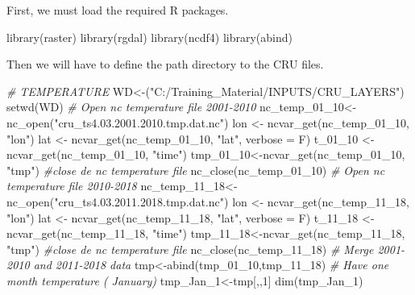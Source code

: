 \documentclass[
  10pt,
  b5paper,
]{book}
\newenvironment{Shaded}{\begin{snugshade}}{\end{snugshade}}
\newcommand{\AttributeTok}[1]{\textcolor[rgb]{0.77,0.63,0.00}{#1}}
\newcommand{\CommentTok}[1]{\textcolor[rgb]{0.56,0.35,0.01}{\textit{#1}}}
\newcommand{\DecValTok}[1]{\textcolor[rgb]{0.00,0.00,0.81}{#1}}
\newcommand{\FunctionTok}[1]{\textcolor[rgb]{0.00,0.00,0.00}{#1}}
\newcommand{\NormalTok}[1]{#1}
\newcommand{\OtherTok}[1]{\textcolor[rgb]{0.56,0.35,0.01}{#1}}
\newcommand{\StringTok}[1]{\textcolor[rgb]{0.31,0.60,0.02}{#1}}
\begin{document}
First, we must load the required R packages.

\begin{Shaded}
\begin{Highlighting}[]
\FunctionTok{library}\NormalTok{(raster)}
\FunctionTok{library}\NormalTok{(rgdal)}
\FunctionTok{library}\NormalTok{(ncdf4)}
\FunctionTok{library}\NormalTok{(abind)}
\end{Highlighting}
\end{Shaded}

Then we will have to define the path directory to the CRU files.

\begin{Shaded}
\begin{Highlighting}[]
\CommentTok{\# TEMPERATURE}
\NormalTok{WD}\OtherTok{\textless{}{-}}\NormalTok{(}\StringTok{"C:/Training\_Material/INPUTS/CRU\_LAYERS"}\NormalTok{)}
\FunctionTok{setwd}\NormalTok{(WD)}
 \CommentTok{\# Open nc temperature file 2001{-}2010}
\NormalTok{nc\_temp\_01\_10}\OtherTok{\textless{}{-}}\FunctionTok{nc\_open}\NormalTok{(}\StringTok{"cru\_ts4.03.2001.2010.tmp.dat.nc"}\NormalTok{)}
\NormalTok{ lon }\OtherTok{\textless{}{-}} \FunctionTok{ncvar\_get}\NormalTok{(nc\_temp\_01\_10, }\StringTok{"lon"}\NormalTok{)}
\NormalTok{lat }\OtherTok{\textless{}{-}} \FunctionTok{ncvar\_get}\NormalTok{(nc\_temp\_01\_10, }\StringTok{"lat"}\NormalTok{, }\AttributeTok{verbose =}\NormalTok{ F)}
\NormalTok{t\_01\_10 }\OtherTok{\textless{}{-}} \FunctionTok{ncvar\_get}\NormalTok{(nc\_temp\_01\_10, }\StringTok{"time"}\NormalTok{)}
\NormalTok{ tmp\_01\_10}\OtherTok{\textless{}{-}}\FunctionTok{ncvar\_get}\NormalTok{(nc\_temp\_01\_10, }\StringTok{"tmp"}\NormalTok{)}
 \CommentTok{\#close de nc temperature file}
 \FunctionTok{nc\_close}\NormalTok{(nc\_temp\_01\_10) }
 \CommentTok{\# Open nc temperature file 2010{-}2018}
\NormalTok{nc\_temp\_11\_18}\OtherTok{\textless{}{-}}\FunctionTok{nc\_open}\NormalTok{(}\StringTok{"cru\_ts4.03.2011.2018.tmp.dat.nc"}\NormalTok{)}
\NormalTok{ lon }\OtherTok{\textless{}{-}} \FunctionTok{ncvar\_get}\NormalTok{(nc\_temp\_11\_18, }\StringTok{"lon"}\NormalTok{)}
\NormalTok{lat }\OtherTok{\textless{}{-}} \FunctionTok{ncvar\_get}\NormalTok{(nc\_temp\_11\_18, }\StringTok{"lat"}\NormalTok{, }\AttributeTok{verbose =}\NormalTok{ F)}
\NormalTok{t\_11\_18 }\OtherTok{\textless{}{-}} \FunctionTok{ncvar\_get}\NormalTok{(nc\_temp\_11\_18, }\StringTok{"time"}\NormalTok{)}
\NormalTok{ tmp\_11\_18}\OtherTok{\textless{}{-}}\FunctionTok{ncvar\_get}\NormalTok{(nc\_temp\_11\_18, }\StringTok{"tmp"}\NormalTok{)}
 \CommentTok{\#close de nc temperature file}
 \FunctionTok{nc\_close}\NormalTok{(nc\_temp\_11\_18) }
 \CommentTok{\# Merge 2001{-}2010 and 2011{-}2018 data }
\NormalTok{ tmp}\OtherTok{\textless{}{-}}\FunctionTok{abind}\NormalTok{(tmp\_01\_10,tmp\_11\_18)}
 \CommentTok{\# Have one month temperature ( January)}
\NormalTok{ tmp\_Jan\_1}\OtherTok{\textless{}{-}}\NormalTok{tmp[,,}\DecValTok{1}\NormalTok{]}
 \FunctionTok{dim}\NormalTok{(tmp\_Jan\_1)}
\end{Highlighting}
\end{Shaded}
\end{document}

